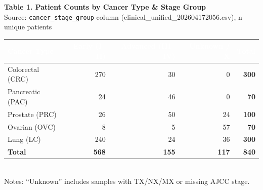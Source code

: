 \documentclass[12pt]{article}
\begin{document}
\vspace*{4mm}
{\LARGE\bfseries\color{headblue} Table 1. Patient Counts by Cancer Type \& Stage Group}\\[2mm]
{\large\color{textmute} Source: \texttt{cancer\_stage\_group} column (clinical\_unified\_202604172056.csv), n unique patients}\\[4mm]
{\Large
\begin{tabular}{>{\raggedright\arraybackslash}p{6.5cm} r r r r}
\toprule
\rowcolor{headblue}
\textcolor{white}{\textbf{Cancer Type}} &
\textcolor{white}{\textbf{Early (I--II)}} &
\textcolor{white}{\textbf{Advanced (III--IV)}} &
\textcolor{white}{\textbf{Unknown / X}} &
\textcolor{white}{\textbf{Total}} \\
\midrule
Colorectal (CRC) & 270 & 30 & 0 & \textbf{300} \\
Pancreatic (PAC) & 24 & 46 & 0 & \textbf{70} \\
Prostate (PRC) & 26 & 50 & 24 & \textbf{100} \\
Ovarian (OVC) & 8 & 5 & 57 & \textbf{70} \\
Lung (LC) & 240 & 24 & 36 & \textbf{300} \\
\midrule
\textbf{Total} & \textbf{568} & \textbf{155} & \textbf{117} & \textbf{840} \\
\bottomrule
\end{tabular}
}
\\[6mm]
{\small\color{textmute}
Notes: ``Unknown'' includes samples with TX/NX/MX or missing AJCC stage.}
\end{document}
